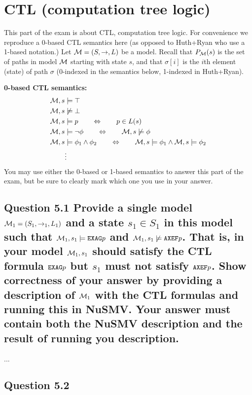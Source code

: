 \section{CTL (computation tree logic)}
This part of the exam is about CTL, computation tree logic. For convenience
we reproduce a 0-based CTL semantics here (as opposed to Huth+Ryan who use a
1-based notation.) Let ${\cal M} = (S,\to,L)$ be a model. Recall that
$P_{\cal M}(s)$ is the set of paths in model ${\cal M}$ starting with state
$s$, and that $\sigma[i]$ is the $i$th element (state) of path $\sigma$
(0-indexed in the semantics below, 1-indexed in Huth+Ryan).

{\bf 0-based CTL semantics:}
\begin{align*}
	{\cal M}, s &\models \top \\
	{\cal M}, s &\not\models \bot \\
	{\cal M}, s &\models p \qquad\Leftrightarrow\qquad p \in L(s) \\
	{\cal M}, s &\models \neg\phi \qquad\Leftrightarrow\qquad
		{\cal M}, s \not\models \phi \\
	{\cal M}, s &\models \phi_1 \land \phi_2 \qquad\Leftrightarrow\qquad
		{\cal M}, s \models \phi_1 \land {\cal M}, s \models \phi_2 \\
	&\vdots
\end{align*}
You may use either the 0-based or 1-based semantics to answer this part of the
exam, but be sure to clearly mark which one you use in your answer.

\subsection*{Question 5.1 \mdseries Provide a single model ${\cal M}_1 =
(S_1, \to_1, L_1)$ and a state $s_1 \in S_1$ in this model such that
${\cal M}_1, s_1 \models \text{\tt EXAG} p$ and ${\cal M}_1, s_1 \not\models
\text{\tt AXEF} p$. That is, in your model ${\cal M}_1, s_1$ should satisfy
the CTL formula $\text{\tt EXAG} p$ but $s_1$ must not satisfy
$\text{\tt AXEF} p$. \newline\indent
Show correctness of your answer by providing a description of ${\cal M}_1$
with the CTL formulas and running this in NuSMV. Your answer must contain both
the NuSMV description and the result of running you description.}
...

\subsection*{Question 5.2}
